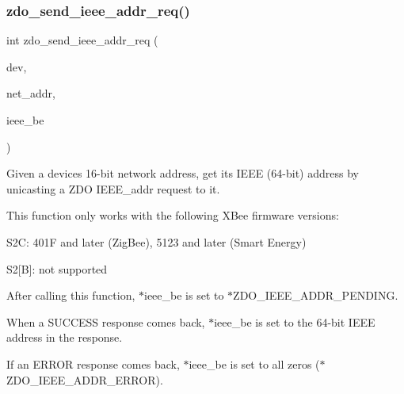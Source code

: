 \mbox{\label{group__zdo_ga4af5f8d70054f7883dbc1305e3a3f181}} 
\subsubsection{\texorpdfstring{zdo\+\_\+send\+\_\+ieee\+\_\+addr\+\_\+req()}{zdo\_send\_ieee\_addr\_req()}}
{\footnotesize\ttfamily int zdo\+\_\+send\+\_\+ieee\+\_\+addr\+\_\+req (\begin{DoxyParamCaption}\item[{\hyperlink{structwpan__dev__t}{wpan\+\_\+dev\+\_\+t} $\ast$}]{dev,  }\item[{\hyperlink{group__hal__dos_ga5a8b2dc9e45a9ee81a94ef304fb62505}{uint16\+\_\+t}}]{net\+\_\+addr,  }\item[{\hyperlink{unionaddr64}{addr64} \hyperlink{group__hal_gaef060b3456fdcc093a7210a762d5f2ed}{F\+AR} $\ast$}]{ieee\+\_\+be }\end{DoxyParamCaption})}



Given a device\textquotesingle{}s 16-\/bit network address, get its I\+E\+EE (64-\/bit) address by unicasting a Z\+DO I\+E\+E\+E\+\_\+addr request to it. 

This function only works with the following X\+Bee firmware versions\+:
\begin{DoxyItemize}
\item S2C\+: 401F and later (Zig\+Bee), 5123 and later (Smart Energy)
\item S2\mbox{[}B\mbox{]}\+: not supported
\end{DoxyItemize}

After calling this function, {\ttfamily $\ast$ieee\+\_\+be} is set to $\ast$\+Z\+D\+O\+\_\+\+I\+E\+E\+E\+\_\+\+A\+D\+D\+R\+\_\+\+P\+E\+N\+D\+I\+NG.

When a S\+U\+C\+C\+E\+SS response comes back, {\ttfamily $\ast$ieee\+\_\+be} is set to the 64-\/bit I\+E\+EE address in the response.

If an E\+R\+R\+OR response comes back, {\ttfamily $\ast$ieee\+\_\+be} is set to all zeros ($\ast$\+Z\+D\+O\+\_\+\+I\+E\+E\+E\+\_\+\+A\+D\+D\+R\+\_\+\+E\+R\+R\+OR).

